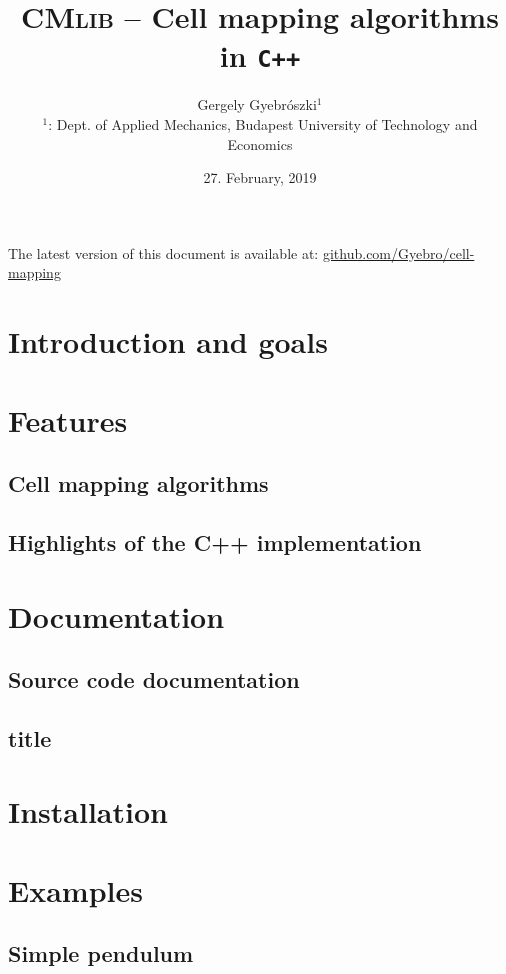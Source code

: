 \documentclass{article}
\title{\textsc{CMlib} -- Cell mapping algorithms in \texttt{C++}}
\author{Gergely Gyebrószki$^1$ \\
$^1$: Dept. of Applied Mechanics, Budapest University of Technology and Economics}
\date{27. February, 2019}
\begin{document}
\maketitle

{\small The latest version of this document is available at: \href{https://github.com/Gyebro/cell-mapping/blob/master/docs/tex/cell-mapping-cpp.pdf}{github.com/Gyebro/cell-mapping}}
	
\section{Introduction and goals}

\section{Features}

\subsection{Cell mapping algorithms}

\subsection{Highlights of the C++ implementation}

\section{Documentation}

\subsection{Source code documentation}

\subsection{title}

\section{Installation}

\section{Examples}

\subsection{Simple pendulum}
\end{document}
